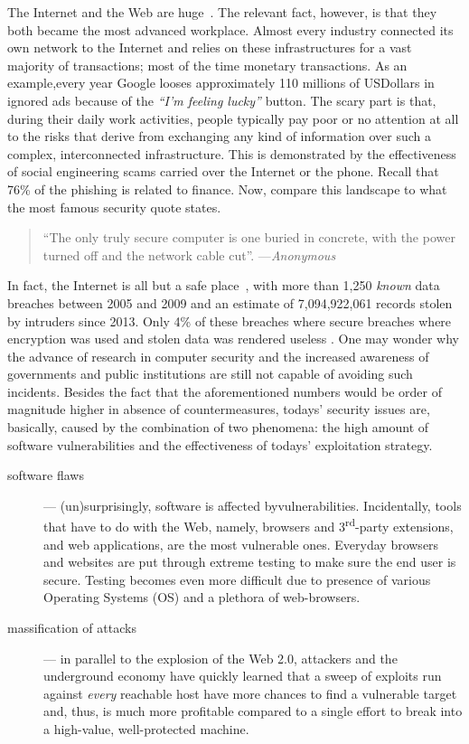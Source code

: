 \documentclass[12pt]{article}
\theoremstyle{definition}
\begin{document}
		The Internet and the Web are huge~\cite{torpig}. The relevant fact, however, is that they both became the most advanced workplace. Almost every industry connected its own network to the Internet and relies on these infrastructures for a vast majority of transactions; most of the time monetary transactions. As an example,every year \textsf{Google} looses approximately 110 millions of USDollars in ignored ads because of the \emph{``I'm feeling lucky''} button. The scary part is that, during their daily work activities, people typically pay poor or no attention at all to the risks that derive from exchanging any kind of information over such a complex, interconnected infrastructure. This is demonstrated by the effectiveness of social engineering scams carried over the Internet or the phone. Recall that 76\% of the phishing is related to finance. Now, compare this landscape to what the most famous security quote states.
		 
		 \begin{quotation}
		 	``The only truly secure computer is one buried in concrete, with the power turned off and the network cable cut''.
		 	---\emph{Anonymous}
		 \end{quotation}
		
		In fact, the Internet is all but a safe place~\cite{whid}, with more than 1,250 \emph{known} data breaches between 2005 and 2009 \cite{breach-data} and an estimate of 7,094,922,061 records stolen by intruders since 2013. Only 4\% of these breaches where secure breaches where encryption was used and stolen data was rendered useless \cite{breach-data}. One may wonder why the advance of research in computer security and the increased awareness of governments and public institutions are still not capable of avoiding such incidents. Besides the fact that the aforementioned numbers would be order of magnitude higher in absence of countermeasures, todays' security issues are, basically, caused by the combination of two phenomena: the high amount of software vulnerabilities and the effectiveness of todays' exploitation strategy.
		
		
		\begin{description}
			\item[software flaws] --- (un)surprisingly, software is affected byvulnerabilities. Incidentally, tools that have to do with the Web,
			namely, browsers and 3\textsuperscript{rd}-party extensions, and web
			applications, are the most vulnerable ones. Everyday browsers and websites are put through extreme testing to make sure the end user is secure. Testing becomes even more difficult due to presence of various Operating Systems (OS) and a plethora of web-browsers.
			
			\item[massification of attacks] --- in parallel to the explosion of the Web 2.0, attackers and the underground economy have quickly learned that a sweep of exploits run against \emph{every} reachable host have more chances to find a vulnerable target and, thus, is much more profitable compared to a single effort to break into a high-value, well-protected machine.
		\end{description}
		
\end{document}

